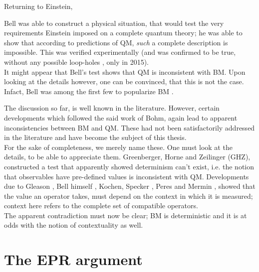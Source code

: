 Returning to Einstein, %

Bell was able to construct a physical situation, that would test the
very requirements Einstein imposed on a complete quantum theory; he
was able to show that according to predictions of QM, \emph{such}
a complete description is impossible. This was verified experimentally
\cite{BellExp72,BellExpAspect81} (and was confirmed to be true, without
any possible loop-holes \cite{BellExpHensen2015}, only in 2015).\\
It might appear that Bell's test shows that QM is inconsistent with
BM. Upon looking at the details however, one can be convinced, that
this is not the case. Infact, Bell was among the first few to popularize
BM \cite{BellSpeakable}.

The discussion so far, is well known in the literature. However, certain
developments which followed the said work of Bohm, again lead to apparent
inconsistencies between BM and QM. These had not been satisfactorily
addressed in the literature and have become the subject of this thesis.
\\
For the sake of completeness, we merely name these. One must look
at the details, to be able to appreciate them. Greenberger, Horne
and Zeilinger (GHZ), constructed a test \cite{GHZ} that apparently
showed determinism can't exist, i.e. the notion that observables have
pre-defined values is inconsistent with QM. Developments due to Gleason
\cite{Gleason}, Bell himself \cite{BellOnHiddenVariables}, Kochen,
Specker \cite{KochenSpecker}, Peres and Mermin \cite{Peres,Mermin},
showed that the value an operator takes, must depend on the context
in which it is measured; context here refers to the complete set of
compatible operators.\\
The apparent contradiction must now be clear; BM is deterministic
and it is at odds with the notion of contextuality as well. 

\section{The EPR argument}

